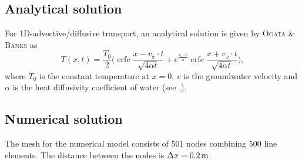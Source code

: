 \subsection{Analytical solution}

For 1D-advective/diffusive transport, an analytical solution is given by \textsc{Ogata $\&$ Banks} as
\begin{equation}
T(x,t)=\frac{T_0}{2}\bigg( \operatorname{erfc} \frac{x-v_x\cdot t}{\sqrt{4\alpha t}} + e^{\frac{v_x\cdot x}{\alpha}} \operatorname{erfc}\frac{x+v_x\cdot t}{\sqrt{4\alpha t}}\bigg),
\label{eqn:addiff1}
\end{equation}
where $T_0$ is the constant temperature at $x=0$, $v$ is the groundwater velocity and $\alpha$ is the heat diffusivity coefficient of water (see \cite{HaeSamVoi:92},\cite{Kol:97}).

\subsection{Numerical solution}

The mesh for the numerical model consists of 501 nodes combining 500 line elements. The distance between the nodes is $\Delta x=\unit[0.2]{m}$.

